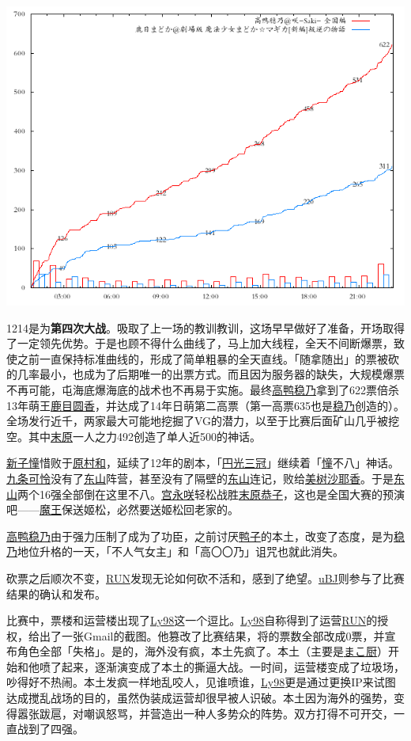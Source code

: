 \includegraphics[width=.5\textwidth]{images/graph1214c.png}

1214是为\textbf{第四次大战}。吸取了上一场的教训教训，这场早早做好了准备，开场取得了一定领先优势。于是也顾不得什么曲线了，马上加大线程，全天不间断爆票，致使之前一直保持标准曲线的，形成了简单粗暴的全天直线。「随拿随出」的票被砍的几率最小，也成为了后期唯一的出票方式。而且因为服务器的缺失，大规模爆票不再可能，屯海底爆海底的战术也不再易于实施。最终\uline{高鸭稳乃}拿到了622票倍杀13年萌王\uline{鹿目圆香}，并达成了14年日萌第二高票（第一高票635也是\uline{稳乃}创造的）。全场发行近千，两家最大可能地挖掘了VG的潜力，以至于比赛后面矿山几乎被挖空。其中\uline{末原}一人之力492创造了单人近500的神话。

\uline{新子憧}惜败于\uline{原村和}，延续了12年的剧本，「\uline{円光三冠}」继续着「\uline{憧}不八」神话。\uline{九条可怜}没有了\uline{东山}阵营，甚至没有了隔壁的\uline{东山}连记，败给\uline{美树沙耶香}。于是\uline{东山}两个16强全部倒在这里不八。\uline{宫永咲}轻松战胜\uline{末原恭子}，这也是全国大赛的预演吧——\uline{魔王}保送{姬松}，必然要送姬松回老家的。

\uline{高鸭稳乃}由于强力压制了成为了功臣，之前讨厌\uline{鸭子}的本土，改变了态度，是为\uline{稳乃}地位升格的一天，「不人气女主」和「高〇〇乃」诅咒也就此消失。

砍票之后顺次不变，\uline{RUN}发现无论如何砍不活和，感到了绝望。\uline{uBJ}则参与了比赛结果的确认和发布。

比赛中，票楼和运营楼出现了\uline{Ly98}这一个逗比。\uline{Ly98}自称得到了运营\uline{RUN}的授权，给出了一张Gmail的截图。他篡改了比赛结果，将的票数全部改成0票，并宣布角色全部「失格」。是的，海外没有疯，本土先疯了。本土（主要是\uline{まこ厨}）开始和他喷了起来，逐渐演变成了本土的撕逼大战。一时间，运营楼变成了垃圾场，吵得好不热闹。本土发疯一样地乱咬人，见谁喷谁，\uline{Ly98}更是通过更换IP来试图达成搅乱战场的目的，虽然伪装成运营却很早被人识破。本土因为海外的强势，变得嚣张跋扈，对嘲讽怒骂，并营造出一种人多势众的阵势。双方打得不可开交，一直战到了四强。

